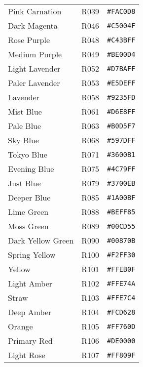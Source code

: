 \documentclass[a4paper]{article}
\begin{document}
\begin{longtable}{|l|l|r|}
Pink Carnation & R039 & \texttt{\#FAC0D8} \cellcolor[HTML]{FAC0D8} \\
Dark Magenta & R046 & \texttt{\#C5004F} \cellcolor[HTML]{C5004F} \\
Rose Purple & R048 & \texttt{\#C43BFF} \cellcolor[HTML]{C43BFF} \\
Medium Purple & R049 & \texttt{\#BE00D4} \cellcolor[HTML]{BE00D4} \\
Light Lavender & R052 & \texttt{\#D7BAFF} \cellcolor[HTML]{D7BAFF} \\
Paler Lavender & R053 & \texttt{\#E5DEFF} \cellcolor[HTML]{E5DEFF} \\
Lavender & R058 & \texttt{\#9235FD} \cellcolor[HTML]{9235FD} \\
Mist Blue & R061 & \texttt{\#D6E8FF} \cellcolor[HTML]{D6E8FF} \\
Pale Blue & R063 & \texttt{\#B0D5F7} \cellcolor[HTML]{B0D5F7} \\
Sky Blue & R068 & \texttt{\#597DFF} \cellcolor[HTML]{597DFF} \\
Tokyo Blue & R071 & \texttt{\#3600B1} \cellcolor[HTML]{3600B1} \\
Evening Blue & R075 & \texttt{\#4C79FF} \cellcolor[HTML]{4C79FF} \\
Just Blue & R079 & \texttt{\#3700EB} \cellcolor[HTML]{3700EB} \\
Deeper Blue & R085 & \texttt{\#1A00BF} \cellcolor[HTML]{1A00BF} \\
Lime Green & R088 & \texttt{\#BEFF85} \cellcolor[HTML]{BEFF85} \\
Moss Green & R089 & \texttt{\#00CD55} \cellcolor[HTML]{00CD55} \\
Dark Yellow Green & R090 & \texttt{\#00870B} \cellcolor[HTML]{00870B} \\
Spring Yellow & R100 & \texttt{\#F2FF30} \cellcolor[HTML]{F2FF30} \\
Yellow & R101 & \texttt{\#FFEB0F} \cellcolor[HTML]{FFEB0F} \\
Light Amber & R102 & \texttt{\#FFE74A} \cellcolor[HTML]{FFE74A} \\
Straw & R103 & \texttt{\#FFE7C4} \cellcolor[HTML]{FFE7C4} \\
Deep Amber & R104 & \texttt{\#FCD628} \cellcolor[HTML]{FCD628} \\
Orange & R105 & \texttt{\#FF760D} \cellcolor[HTML]{FF760D} \\
Primary Red & R106 & \texttt{\#DE0000} \cellcolor[HTML]{DE0000} \\
Light Rose & R107 & \texttt{\#FF809F} \cellcolor[HTML]{FF809F} \\

\end{longtable}
\end{document}

